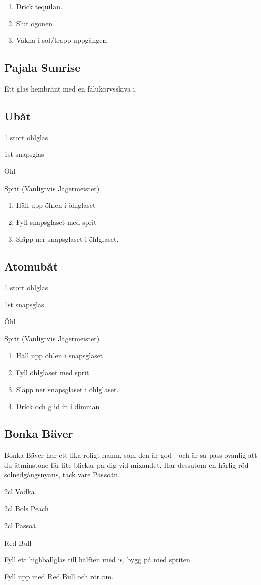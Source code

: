 \begin{enumerate}
    \item Drick tequilan.
    \item Slut ögonen.
    \item Vakna i sol/trapp-uppgången
\end{enumerate}


\filbreak
\subsection*{\textbf{Pajala Sunrise}}

Ett glas hembränt med en falukorvsskiva i.
\filbreak
\subsection*{\textbf{Ubåt}}

1 stort öhlglas

1st snapsglas

Öhl

Sprit (Vanligtvis Jägermeister)

\begin{enumerate}
    \item Häll upp öhlen i öhlglaset
    \item Fyll snapsglaset med sprit
    \item Släpp ner snapsglaset i öhlglaset.
\end{enumerate}

\filbreak
\subsection*{\textbf{Atomubåt}}

1 stort öhlglas

1st snapsglas

Öhl

Sprit (Vanligtvis Jägermeister)

\begin{enumerate}
    \item Häll upp öhlen i snapsglaset
    \item Fyll öhlglaset med sprit
    \item Släpp ner snapsglaset i öhlglaset.
    \item Drick och glid in i dimman
\end{enumerate}
\filbreak
\subsection*{\textbf{Bonka Bäver}}

Bonka Bäver har ett lika roligt namn, som den är god - och är så pass ovanlig att du åtminstone får lite blickar på dig vid mixandet. Har dessutom en härlig röd solnedgångsnyans, tack vare Passoãn.

2cl Vodka

2cl Bols Peach

2cl Passoã

Red Bull

Fyll ett highballglas till hälften med is, bygg på med spriten.

Fyll upp med Red Bull och rör om.

\newpage
